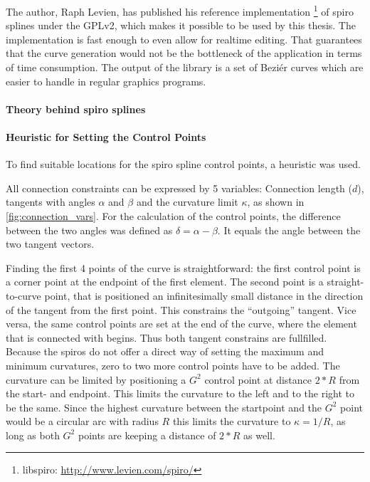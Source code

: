 

The author, Raph Levien, has published his reference implementation \footnote{libspiro: \url{http://www.levien.com/spiro/}} of spiro splines under the GPLv2, which makes it possible to be used by this thesis. The implementation is fast enough to even allow for realtime editing. That guarantees that the curve generation would not be the bottleneck of the application in terms of time consumption. The output of the library is a set of Beziér curves which are easier to handle in regular graphics programs.

\paragraph{Theory behind spiro splines}


\paragraph{Heuristic for Setting the Control Points}

To find suitable locations for the spiro spline control points, a heuristic was used.

All connection constraints can be expressed by 5 variables: Connection length ($d$), tangents with angles $\alpha$ and $\beta$ and the curvature limit $\kappa$, as shown in \autoref{fig:connection_vars}. For the calculation of the control points, the difference between the two angles was defined as $\delta = \alpha - \beta$. It equals the angle between the two tangent vectors. 

Finding the first 4 points of the curve is straightforward: the first control point is a corner point at the endpoint of the first element. The second point is a straight-to-curve point, that is positioned an infinitesimally small distance in the direction of the tangent from the first point. This constrains the \enquote{outgoing} tangent. Vice versa, the same control points are set at the end of the curve, where the element that is connected with begins. Thus both tangent constrains are fullfilled. Because the spiros do not offer a direct way of setting the maximum and minimum curvatures, zero to two more control points have to be added. The curvature can be limited by positioning a $G^2$ control point at distance $2 * R$ from the start- and endpoint. This limits the curvature to the left and to the right to be the same. Since the highest curvature between the startpoint and the $G^2$ point would be a circular arc with radius $R$ this limits the curvature to $\kappa = 1/R$, as long as both $G^2$ points are keeping a distance of $2*R$ as well.

